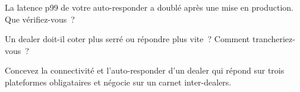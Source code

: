 \begin{interviewq}\label{iq:nw:fixed-income-and-rfq-platform-connectivity:4}
La latence p99 de votre auto-responder a doublé après une mise en production. Que vérifiez-vous~?
\end{interviewq}

\begin{interviewq}\label{iq:nw:fixed-income-and-rfq-platform-connectivity:5}
Un dealer doit-il coter plus serré ou répondre plus vite~? Comment trancheriez-vous~?
\end{interviewq}

\begin{interviewq}\label{iq:nw:fixed-income-and-rfq-platform-connectivity:6}
Concevez la connectivité et l'auto-responder d'un dealer qui répond sur trois plateformes obligataires et négocie sur un carnet inter-dealers.
\end{interviewq}

